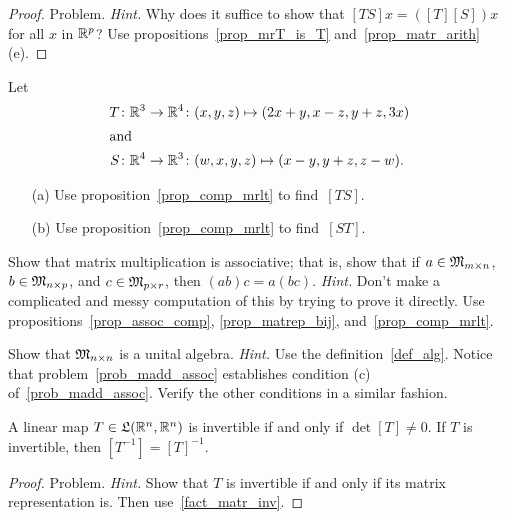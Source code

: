 \begin{proof} Problem.  \emph{Hint.}  Why does it suffice to show that $[TS]x = ([T][S])x$
for all $x$ in $\mathbb{R}^p$?  Use propositions~\ref{prop_mrT_is_T} and~\ref{prop_matr_arith}(e). \ns
\end{proof}

\begin{prob} Let
 \begin{align*}
     T \colon \mathbb{R}^3 \rightarrow \mathbb{R}^4 & \colon  (x,y,z) \mapsto (2x+y, x-z, y+z, 3x) \\
  \intertext{and}
     S \colon \mathbb{R}^4 \rightarrow \mathbb{R}^3 & \colon  (w,x,y,z) \mapsto (x-y, y+z, z-w).
 \end{align*}
 \begin{enumerate}
  \item[(a)] Use proposition~\ref{prop_comp_mrlt} to find~$[TS]$.
  \item[(b)] Use proposition~\ref{prop_comp_mrlt} to find~$[ST]$.
 \end{enumerate}
\end{prob}

\begin{prob}\label{prob_madd_assoc}  Show that matrix multiplication is associative; that is,
show that if $a \in \mathfrak{M}_{m \times n}$, $b \in \mathfrak{M}_{n \times p}$, and $c \in \mathfrak{M}_{p
\times r}$, then $(ab)c = a(bc)$. \emph{Hint.} Don't make a complicated and messy computation
of this by trying to prove it directly.  Use propositions~\ref{prop_assoc_comp},
\ref{prop_matrep_bij}, and~\ref{prop_comp_mrlt}.  \ns
\end{prob}

\begin{prob}  Show that $\mathfrak{M}_{n \times n}$ is a unital algebra.  \emph{Hint.}  Use the
definition~\ref{def_alg}. Notice that problem~\ref{prob_madd_assoc} establishes condition (c)
of~\ref{prob_madd_assoc}.  Verify the other conditions in a similar fashion.
\end{prob}

\begin{prop}\label{prop_matr_inv} A linear map $T \in \mathfrak{L}(\mathbb{R}^n,\mathbb{R}^n)$ is invertible if and
only if $\det[T] \ne 0$.  If $T$ is invertible, then $[T^{-1}] = [T]^{-1}$.
\end{prop}

\begin{proof} Problem. \emph{Hint.}  Show that $T$ is invertible if and only if its matrix
representation is.  Then use~\ref{fact_matr_inv}. \ns \end{proof}

